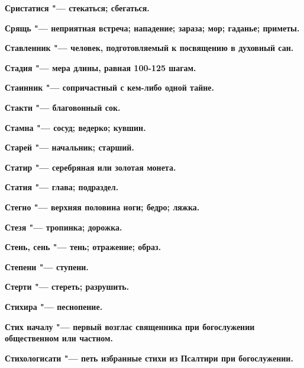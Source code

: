 \bfseries Сристатися \normalfont{} "--- стекаться; сбегаться. 




\bfseries Срящь \normalfont{} "--- неприятная встреча; нападение; зараза; мор; гаданье; приметы. 




\bfseries Ставленник \normalfont{} "--- человек, подготовляемый к посвящению в духовный сан. 




\bfseries Стадия \normalfont{} "--- мера длины, равная 100-125 шагам. 




\bfseries Стаинник \normalfont{} "--- сопричастный с кем-либо одной тайне. 




\bfseries Стакти \normalfont{} "--- благовонный сок. 




\bfseries Стамна \normalfont{} "--- сосуд; ведерко; кувшин. 




\bfseries Старей \normalfont{} "--- начальник; старший. 




\bfseries Статир \normalfont{} "--- серебряная или золотая монета. 




\bfseries Статия \normalfont{} "--- глава; подраздел. 




\bfseries Стегно \normalfont{} "--- верхняя половина ноги; бедро; ляжка. 




\bfseries Стезя \normalfont{} "--- тропинка; дорожка. 




\bfseries Стень, сень \normalfont{} "--- тень; отражение; образ. 




\bfseries Степени \normalfont{} "--- ступени. 




\bfseries Стерти \normalfont{} "--- стереть; разрушить. 




\bfseries Стихира \normalfont{} "--- песнопение. 




\bfseries Стих началу \normalfont{} "--- первый возглас священника при богослужении общественном или частном. 




\bfseries Стихологисати \normalfont{} "--- петь избранные стихи из Псалтири при богослужении. 




